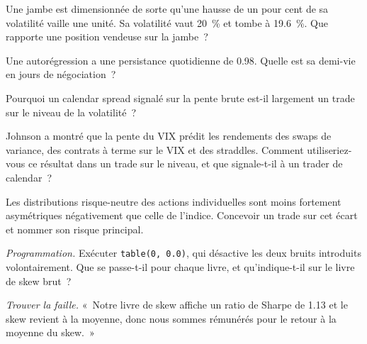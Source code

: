 \begin{exercise}[$\star$]\label{exo:s2:skew-and-term-structure-relative-value:2}
Une jambe est dimensionnée de sorte qu'une hausse de un pour cent de sa volatilité vaille une unité. Sa volatilité vaut 20~\% et tombe à 19.6~\%. Que rapporte une position vendeuse sur la jambe~?
\end{exercise}

\begin{exercise}[$\star$]\label{exo:s2:skew-and-term-structure-relative-value:3}
Une autorégression a une persistance quotidienne de 0.98. Quelle est sa demi-vie en jours de négociation~?
\end{exercise}

\begin{exercise}[$\star\star$]\label{exo:s2:skew-and-term-structure-relative-value:4}
Pourquoi un calendar spread signalé sur la pente brute est-il largement un trade sur le niveau de la volatilité~?
\end{exercise}

\begin{exercise}[$\star\star$]\label{exo:s2:skew-and-term-structure-relative-value:5}
Johnson a montré que la pente du VIX prédit les rendements des swaps de variance, des contrats à terme sur le VIX et des straddles. Comment utiliseriez-vous ce résultat dans un trade sur le niveau, et que
signale-t-il à un trader de calendar~?
\end{exercise}

\begin{exercise}[$\star\star$]\label{exo:s2:skew-and-term-structure-relative-value:6}
Les distributions risque-neutre des actions individuelles sont moins fortement asymétriques négativement que celle de l'indice. Concevoir un trade sur cet écart et nommer son risque principal.
\end{exercise}

\begin{exercise}[$\star\star\star$]\label{exo:s2:skew-and-term-structure-relative-value:7}
\emph{Programmation.} Exécuter \texttt{table(0, 0.0)}, qui désactive les deux bruits introduits volontairement. Que se passe-t-il pour chaque livre, et qu'indique-t-il sur le
livre de skew brut~?
\end{exercise}

\begin{exercise}[$\star\star\star$]\label{exo:s2:skew-and-term-structure-relative-value:8}
\emph{Trouver la faille.} «~Notre livre de skew affiche un ratio de Sharpe de 1.13 et le skew revient à la moyenne, donc nous sommes rémunérés pour le retour à la moyenne du skew.~»
\end{exercise}

